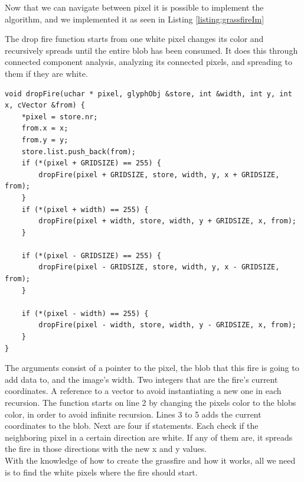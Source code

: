  Now that we can navigate between pixel it is possible to implement the algorithm, and we implemented it as seen in Listing \ref{listing:grassfireIm}
\begin{listing}[H]
	\caption{The drop fire function starts from one white pixel changes its color and recursively spreads until the entire blob has been consumed. It does this through connected component analysis, analyzing its connected pixels, and spreading to them if they are white.}
	\begin{verbatim}
void dropFire(uchar * pixel, glyphObj &store, int &width, int y, int x, cVector &from) {
	*pixel = store.nr;
	from.x = x;
	from.y = y;
	store.list.push_back(from);
	if (*(pixel + GRIDSIZE) == 255) {
		dropFire(pixel + GRIDSIZE, store, width, y, x + GRIDSIZE, from);
	}
	if (*(pixel + width) == 255) {
		dropFire(pixel + width, store, width, y + GRIDSIZE, x, from);
	}
	
	if (*(pixel - GRIDSIZE) == 255) {
		dropFire(pixel - GRIDSIZE, store, width, y, x - GRIDSIZE, from);
	}
	
	if (*(pixel - width) == 255) {
		dropFire(pixel - width, store, width, y - GRIDSIZE, x, from);
	}
}
	\end{verbatim}
	\label{listing:grassfireIm}
\end{listing} 
The arguments consist of a pointer to the pixel, the blob that this fire is going to add data to, and the image's width. Two integers that are the fire's current coordinates. A reference to a vector to avoid instantiating a new one in each recursion. The function starts on line 2 by changing the pixels color to the blobs color, in order to avoid infinite recursion. Lines 3 to 5 adds the current coordinates to the blob. Next are four if statements. Each check if the neighboring pixel in a certain direction are white. If any of them are, it spreads the fire in those directions with the new x and y values.\\
With the knowledge of how to create the grassfire and how it works, all we need is to find the white pixels where the fire should start.

